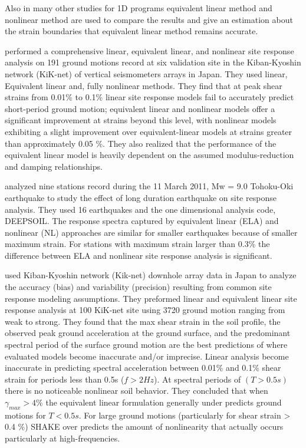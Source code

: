 Also in many other studies for 1D programs equivalent linear method and nonlinear method are used to compare the results and give an estimation about the strain boundaries that equivalent linear method remains accurate.

 \citet{Kaklamanos2015} performed a comprehensive linear, equivalent linear, and nonlinear site response analysis on 191 ground motions record at six validation site in the Kiban-Kyoshin network (KiK-net) of vertical seismometers arrays in Japan. They used linear, Equivalent linear and, fully nonlinear methods. They find that at peak shear strains from 0.01\% to 0.1\% linear site response models fail to accurately predict short-period ground motion; equivalent linear and nonlinear models offer a significant improvement at strains beyond this level, with nonlinear models exhibiting a slight improvement over equivalent-linear models at strains greater than approximately 0.05 \%. They also realized that the performance of the equivalent linear model is heavily dependent on the assumed modulus-reduction and damping relationships. 

\citet{Kim2013site} analyzed nine stations record during the 11 March 2011, Mw = 9.0 Tohoku-Oki earthquake to study the effect of long duration earthquake on site response analysis. They used 16 earthquakes and the one dimensional analysis code, DEEPSOIL. The response spectra captured by equivalent linear (ELA) and nonlinear (NL) approaches are similar for smaller earthquakes because of smaller maximum strain. For stations with maximum strain larger than 0.3\% the difference between ELA and nonlinear site response analysis is significant. 

\citet{Kaklamanos2013critical} used Kiban-Kyoshin network (Kik-net) downhole array data in Japan to analyze the accuracy (bias) and variability (precision) resulting from common site response modeling assumptions. They preformed linear and equivalent linear site response analysis at 100 KiK-net site using 3720 ground motion ranging from weak to strong. They found that the max shear strain in the soil profile, the observed peak ground acceleration at the ground surface, and the predominant spectral period of the surface ground motion are the best predictions of where evaluated models become inaccurate and/or imprecise. Linear analysis become inaccurate in predicting spectral acceleration between 0.01\% and 0.1\% shear strain for periods less than 0.5s ($f  > 2 Hz$). At spectral periods of $(T > 0.5 s)$ there is no noticeable nonlinear soil behavior. They concluded that when $\gamma_{max} > 4 \%$ the equivalent linear formulation generally under predicts ground motions for $T < 0.5 s$. For large ground motions (particularly for shear strain > 0.4 \%) SHAKE over predicts the amount of nonlinearity that actually occurs particularly at high-frequencies. 

